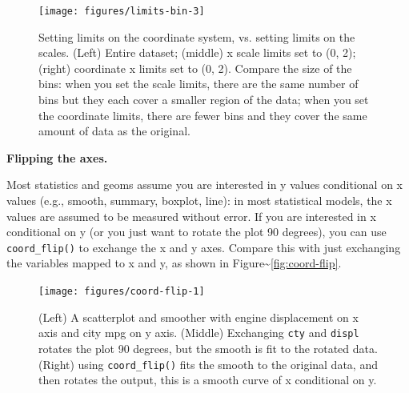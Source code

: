 \begin{figure}
\texttt{[image: figures/limits-bin-3]} \caption{Setting limits on the coordinate system, vs. setting limits on the scales.  (Left) Entire dataset; (middle) x scale limits set to (0, 2); (right) coordinate x limits set to (0, 2).  Compare the size of the bins: when you set the scale limits, there are the same number of bins but they each cover a smaller region of the data; when you set the coordinate limits, there are fewer bins and they cover the same amount of data as the original.\label{fig:limits-bin3}}
\end{figure}

\textbf{Flipping the axes.}

Most statistics and geoms assume you are interested in y values
conditional on x values (e.g., smooth, summary, boxplot, line): in most
statistical models, the x values are assumed to be measured without
error. If you are interested in x conditional on y (or you just want to
rotate the plot 90 degrees), you can use \texttt{coord\_flip()} to
exchange the x and y axes. Compare this with just exchanging the
variables mapped to x and y, as shown in
Figure\textasciitilde{}\ref{fig:coord-flip}. 
 

\begin{Shaded}
\begin{Highlighting}[]
 \StringTok{ }\NormalTok{()}
\end{Highlighting}
\end{Shaded}

\begin{figure}
\texttt{[image: figures/coord-flip-1]} \caption{(Left) A scatterplot and smoother with engine displacement on x axis and city mpg on y axis.  (Middle) Exchanging \texttt{cty} and \texttt{displ} rotates the plot 90 degrees, but the smooth is fit to the rotated data.  (Right) using \texttt{coord\_flip()} fits the smooth to the original data, and then rotates the output, this is a smooth curve of x conditional on y.\label{fig:coord-flip1}}
\end{figure}

\begin{Shaded}
\begin{Highlighting}[]
 \StringTok{ }\NormalTok{()}
\end{Highlighting}
\end{Shaded}

